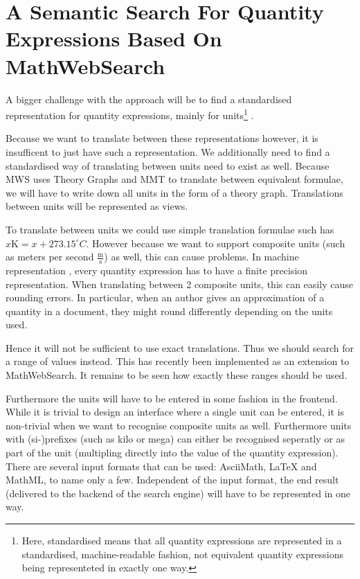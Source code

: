 \documentclass[11pt]{article}
\begin{document}
\section{A Semantic Search For Quantity Expressions Based On MathWebSearch}
\label{sec:system}


A bigger challenge with the approach will be to find a standardised representation for quantity expressions, mainly for units\footnote{Here, standardised means that all quantity expressions are represented in a standardised, machine-readable fashion, not equivalent quantity expressions being representeted in exactly one way. } .

Because we want to translate between these representations however, it is insufficent to just have such a representation. We additionally need to find a standardised way of translating between units need to exist as well. Because MWS uses Theory Graphs and MMT to translate between equivalent formulae, we will have to write down all units in the form of a theory graph. Translations between units will be represented as views.

To translate between units we could use simple translation formulae such has $x \text{K} = x + 273.15 ^\circ{C} $. However because we want to support composite units (such as meters per second $\frac{\text{m}}{\text{s}}$) as well, this can cause problems. In machine representation , every quantity expression has to have a finite precision representation. When translating between 2 composite units, this can easily cause rounding errors. In particular, when an author gives an approximation of a quantity in a document, they might round differently depending on the units used.

Hence it will not be sufficient to use exact translations. Thus we should search for a range of values instead. This has recently been implemented as an extension to MathWebSearch\cite{MWS:Ranges}. It remains to be seen how exactly these ranges should be used.

Furthermore the units will have to be entered in some fashion  in the frontend. While it is trivial to design an interface where a single unit can be entered, it is non-trivial when we want to recognise composite units as well. Furthermore units with (si-)prefixes (such as kilo or mega) can either be recognised seperatly or as part of the unit (multipling directly into the value of the quantity expression). There are several input formats that can be used: AsciiMath, \LaTeX{} and MathML, to name only a few. Independent of the input format, the end result (delivered to the backend of the search engine) will have to be represented in one way.
\end{document}
